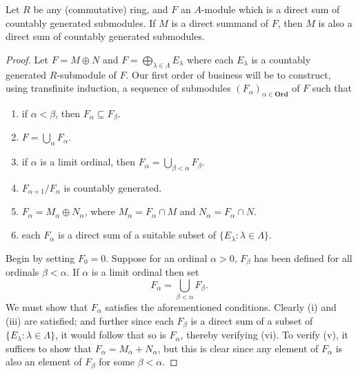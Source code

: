 \begin{lemma}
    Let $R$ be any (commutative) ring, and $F$ an $A$-module which is a direct sum of countably generated submodules. If $M$ is a direct summand of $F$, then $M$ is also a direct sum of countably generated submodules.
\end{lemma}
\begin{proof}
    Let $F = M\oplus N$ and $\displaystyle F = \bigoplus_{\lambda\in\Lambda} E_\lambda$ where each $E_\lambda$ is a countably generated $R$-submodule of $F$. Our first order of business will be to construct, using transfinite induction, a sequence of submodules $(F_\alpha)_{\alpha\in\mathbf{Ord}}$ of $F$ such that 
    \begin{enumerate}[label=(\roman*)]
        \item if $\alpha < \beta$, then $F_\alpha\subseteq F_\beta$. 
        \item $\displaystyle F = \bigcup_{\alpha} F_\alpha$. 
        \item if $\alpha$ is a limit ordinal, then $\displaystyle F_\alpha = \bigcup_{\beta < \alpha} F_\beta$. 
        \item $F_{\alpha + 1}/F_\alpha$ is countably generated. 
        \item $F_\alpha = M_\alpha\oplus N_\alpha$, where $M_\alpha = F_\alpha\cap M$ and $N_\alpha = F_\alpha\cap N$.
        \item each $F_\alpha$ is a direct sum of a suitable subset of $\{E_\lambda\colon\lambda\in\Lambda\}$.
    \end{enumerate}
    Begin by setting $F_0 = 0$. Suppose for an ordinal $\alpha > 0$, $F_\beta$ has been defined for all ordinals $\beta < \alpha$. If $\alpha$ is a limit ordinal then set 
    \begin{equation*}
        F_\alpha = \bigcup_{\beta < \alpha} F_\beta.
    \end{equation*}
    We must show that $F_\alpha$ satisfies the aforementioned conditions. Clearly (i) and (iii) are satisfied; and further since each $F_\beta$ is a direct sum of a subset of $\{E_\lambda\colon \lambda\in\Lambda\}$, it would follow that so is $F_\alpha$, thereby verifying (vi). To verify (v), it suffices to show that $F_\alpha = M_\alpha + N_\alpha$, but this is clear since any element of $F_\alpha$ is also an element of $F_\beta$ for some $\beta < \alpha$.


\end{proof}
